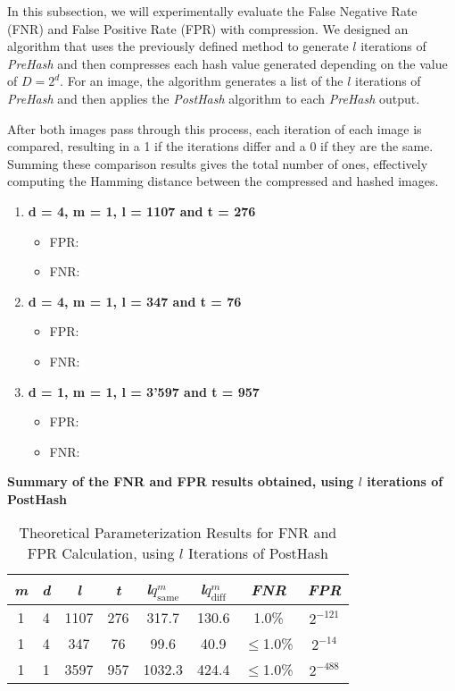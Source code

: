 In this subsection, we will experimentally evaluate the False Negative Rate (FNR) and False Positive Rate (FPR) with compression. We designed an algorithm that uses the previously defined method to generate \( l \) iterations of \textit{PreHash} and then compresses each hash value generated depending on the value of \(D = 2^d\). For an image, the algorithm generates a list of the \( l \) iterations of \textit{PreHash} and then applies the \textit{PostHash} algorithm to each \textit{PreHash} output.

After both images pass through this process, each iteration of each image is compared, resulting in a 1 if the iterations differ and a 0 if they are the same. Summing these comparison results gives the total number of ones, effectively computing the Hamming distance between the compressed and hashed images.

\begin{enumerate}
    \item \textbf{d = 4, m = 1, l = 1107 and t = 276}
        \begin{itemize}
            \item FPR: 
            \item FNR: 
        \end{itemize}
    \item \textbf{d = 4, m = 1, l = 347 and t = 76}
        \begin{itemize}
            \item FPR: 
            \item FNR: 
        \end{itemize}
    \item \textbf{d = 1, m = 1, l = 3'597 and t = 957}
        \begin{itemize}
            \item FPR: 
            \item FNR: 
        \end{itemize}
\end{enumerate}

\textbf{Summary of the FNR and FPR results obtained, using $l$ iterations of PostHash}
\begin{table}[htbp] 
    \centering
    \begin{tabular}{|c|c|c|c|c|c|c|c|}
        \hline
        \textit{m} & \textit{d} & \textit{l} & \textit{t} & \textit{l}\(q_{\text{same}}^m\) & \textit{l}\(q_{\text{diff}}^m\) & \textit{FNR} & \textit{FPR} \\
        \hline
        1 & 4 & 1107 & 276 & 317.7 & 130.6 & 1.0\% & \(2^{-121}\) \\
        1 & 4 & 347 & 76 & 99.6 & 40.9 & \(\leq\)1.0\% & \(2^{-14}\)\\
        1 & 1 & 3597 & 957 & 1032.3 & 424.4 & \(\leq\)1.0\% & \(2^{-488}\)\\
        \hline
    \end{tabular}
    \caption{Theoretical Parameterization Results for FNR and FPR Calculation, using $l$ Iterations of PostHash}
    \label{tab:theoretical_parameterization_PostHash}
\end{table}